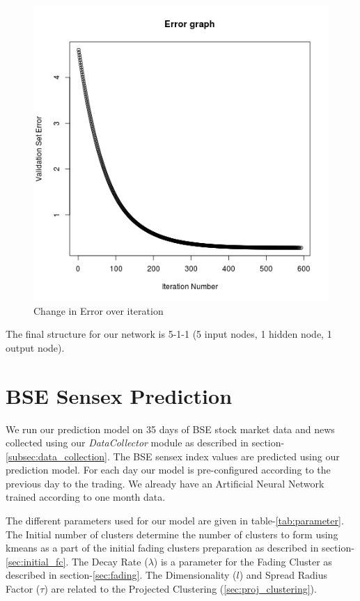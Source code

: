 \documentclass[a4paper,12bp]{report}
\begin{document}
\begin{figure}[htbp]
\centering
\includegraphics[scale = 0.6]{pictures/errorPlot.png}
\caption{Change in Error over iteration}
\label{fig:error_plot}
\end{figure}

The final structure for our network is 5-1-1 (5 input nodes, 1 hidden node, 1 output node).

\section{BSE Sensex Prediction}

We run our prediction model on 35 days of BSE stock market data and news collected using our \textit{DataCollector} module as described in section-\ref{subsec:data_collection}. The BSE sensex index values are predicted using our prediction model. For each day our model is pre-configured according to the previous day to the trading. We already have an Artificial Neural Network trained according to one month data. 

The different parameters used for our model are given in table-\ref{tab:parameter}. The Initial number of clusters determine the number of clusters to form using kmeans as a part of the initial fading clusters preparation as described in section-\ref{sec:initial_fc}. The Decay Rate ($\lambda$) is a parameter for the Fading Cluster as described in section-\ref{sec:fading}. The Dimensionality ($l$) and Spread Radius Factor ($\tau$) are related to the Projected Clustering (\ref{sec:proj_clustering}).
\end{document}
